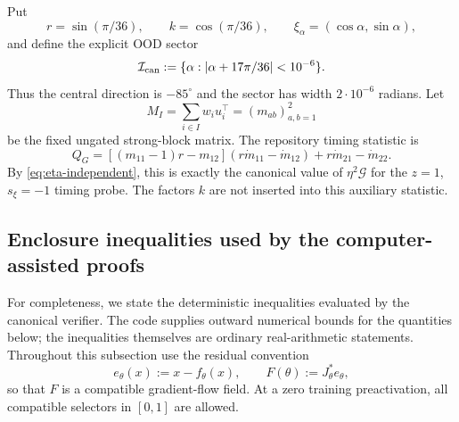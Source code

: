 \documentclass[10pt]{article}
\theoremstyle{remark}\newtheorem{remark}[theorem]{Remark}
\begin{document}
Put
\[
 r=\sin(\pi/36),\qquad k=\cos(\pi/36),\qquad
 \xi_\alpha=(\cos\alpha,\sin\alpha),
\]
and define the explicit OOD sector
\begin{equation}\label{eq:canonical-sector}
 \mathcal I_{\rm can}
 :=\{\alpha:|\alpha+17\pi/36|<10^{-6}\}.
\end{equation}
Thus the central direction is $-85^\circ$ and the sector has width
$2\cdot10^{-6}$ radians. Let
\[
 M_I=\sum_{i\in I}w_i u_i^\top=(m_{ab})_{a,b=1}^2
\]
be the fixed ungated strong-block matrix. The repository timing statistic is
\begin{equation}\label{eq:canonical-QG}
 Q_G=[(m_{11}-1)r-m_{12}](r\dot m_{11}-\dot m_{12})
        +r\dot m_{21}-\dot m_{22}.
\end{equation}
By \eqref{eq:eta-independent}, this is exactly the canonical value of
$\eta^2\mathcal G$ for the $z=1$, $s_\xi=-1$ timing probe. The factors $k$
are not inserted into this auxiliary statistic.


\subsection{Enclosure inequalities used by the computer-assisted proofs}
\label{app:canonical-enclosures}

For completeness, we state the deterministic inequalities evaluated by the
canonical verifier. The code supplies outward numerical bounds for the
quantities below; the inequalities themselves are ordinary real-arithmetic
statements. Throughout this subsection use the residual convention
\[
 e_\theta(x):=x-f_\theta(x),\qquad
 F(\theta):=J_\theta^*e_\theta,
\]
so that $F$ is a compatible gradient-flow field. At a zero training
preactivation, all compatible selectors in $[0,1]$ are allowed.
\end{document}
